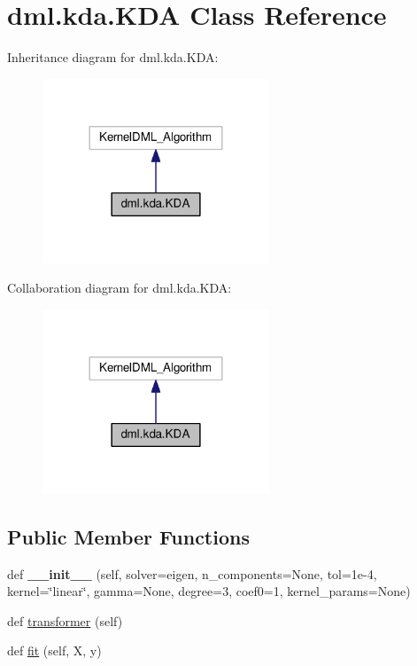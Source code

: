 \hypertarget{classdml_1_1kda_1_1KDA}{}\section{dml.\+kda.\+K\+DA Class Reference}
\label{classdml_1_1kda_1_1KDA}


Inheritance diagram for dml.\+kda.\+K\+DA\+:
\nopagebreak
\begin{figure}[H]
\begin{center}
\leavevmode
\includegraphics[width=192pt]{classdml_1_1kda_1_1KDA__inherit__graph}
\end{center}
\end{figure}


Collaboration diagram for dml.\+kda.\+K\+DA\+:
\nopagebreak
\begin{figure}[H]
\begin{center}
\leavevmode
\includegraphics[width=192pt]{classdml_1_1kda_1_1KDA__coll__graph}
\end{center}
\end{figure}
\subsection*{Public Member Functions}
\begin{DoxyCompactItemize}
\item 
def {\bfseries \+\_\+\+\_\+init\+\_\+\+\_\+} (self, solver=\textquotesingle{}eigen\textquotesingle{}, n\+\_\+components=None, tol=1e-\/4, kernel=\char`\"{}linear\char`\"{}, gamma=\+None, degree=3, coef0=1, kernel\+\_\+params=\+None)\hypertarget{classdml_1_1kda_1_1KDA_a36fe718d7f2acf4664420bc1e370ada9}{}\label{classdml_1_1kda_1_1KDA_a36fe718d7f2acf4664420bc1e370ada9}

\item 
def \hyperlink{classdml_1_1kda_1_1KDA_aecc0bd189d2080ac3cb2248e3ded47c4}{transformer} (self)
\item 
def \hyperlink{classdml_1_1kda_1_1KDA_a1a22e6ac1e9833d1a6cca60c9bc832d8}{fit} (self, X, y)
\end{DoxyCompactItemize}
